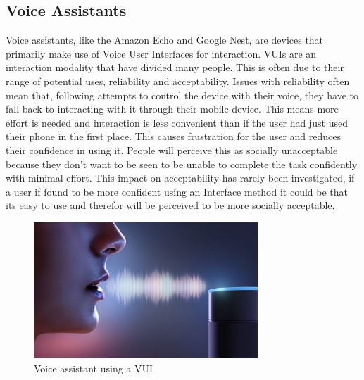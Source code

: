 \documentclass{l4proj}
\begin{document}
\subsection{Voice Assistants}


Voice assistants, like the Amazon Echo and Google Nest, are devices that primarily make use of Voice User Interfaces for interaction. VUIs are an interaction modality that have divided many people. This is often due to their range of potential uses, reliability and acceptability. Issues with reliability often mean that, following attempts to control the device with their voice, they have to fall back to interacting with it through their mobile device. This means more effort is needed and interaction is less convenient than if the user had just used their phone in the first place. This causes frustration for the user and reduces their confidence in using it. People will perceive this as socially unacceptable because they don't want to be seen to be unable to complete the task confidently with minimal effort. This impact on acceptability has rarely been investigated, if a user if found to be more confident using an Interface method it could be that its easy to use and therefor will be perceived to be more socially acceptable.

\begin{figure}[!htb]
    \centering
    \includegraphics[width=0.75\textwidth]{images/VUI.jpg}
        \caption{Voice assistant using a VUI}
        \label{fig:syn1}
\end{figure}
\end{document}
